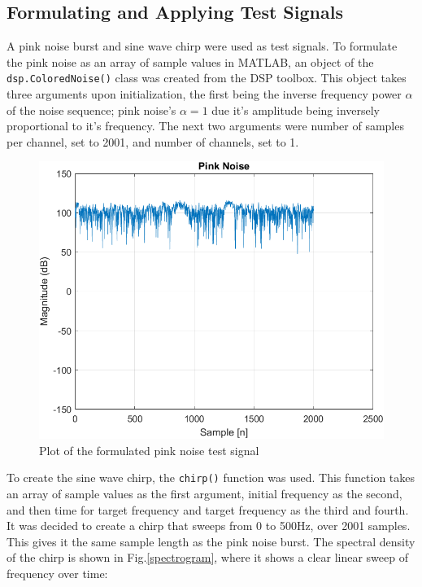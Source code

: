 \documentclass[conference]{IEEEtran}
\def\code#1{\texttt{#1}}
\begin{document}
    \subsection{Formulating and Applying Test Signals}
        A pink noise burst and sine wave chirp were used as test signals.
        To formulate the pink noise as an array of sample values in MATLAB, an object of the \code{dsp.ColoredNoise()} class was created from the DSP toolbox.
        This object takes three arguments upon initialization, the first being the inverse frequency power $\alpha$ of the noise sequence; pink noise's $\alpha = 1$ due it's amplitude being inversely proportional to it's frequency.
        The next two arguments were number of samples per channel, set to 2001, and number of channels, set to 1.
        \begin{figure}[H]
            \centering
            \includegraphics[scale = 0.65]{resources/pinkNoiseGraph.png}
            \caption{Plot of the formulated pink noise test signal}
            \label{pinkNoiseGraph}
        \end{figure}
        To create the sine wave chirp, the \code{chirp()} function was used.
        This function takes an array of sample values as the first argument, initial frequency as the second, and then time for target frequency and target frequency as the third and fourth.
        It was decided to create a chirp that sweeps from 0 to 500Hz, over 2001 samples.
        This gives it the same sample length as the pink noise burst.
        The spectral density of the chirp is shown in Fig.\ref{spectrogram}, where it shows a clear linear sweep of frequency over time:
\end{document}

